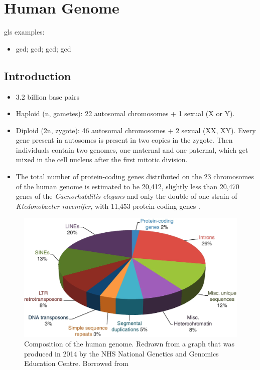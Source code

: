 \chapter{Human Genome}\label{chp:human_genome}

\minitoc

gls examples:
\begin{itemize}
	\item \Gls{gcd}; \acrlong{gcd}; \acrshort{gcd}; \acrfull{gcd}
\end{itemize}

\section{Introduction}
\begin{itemize}
    \item 3.2 billion base pairs 
    \item Haploid (n, gametes): 22 autosomal chromosomes + 1 sexual (X or Y).
    \item Diploid (2n, zygote): 46 autosomal chromosomes + 2 sexual (XX, XY). Every gene present in autosomes is present 
    in two copies in the zygote. Then individuals contain two genomes, one maternal and one paternal, which get mixed in 
    the cell nucleus after the first mitotic division.
    \item The total number of protein-coding genes distributed on the 23 chromosomes of the human genome is estimated to 
    be 20,412, slightly less than 20,470 genes of the \textit{Caenorhabditis elegans} \cite{Pena2021} and only the double of one strain of 
    \textit{Ktedonobacter racemifer}, with 11,453 protein-coding genes \cite{He2024}.
\end{itemize}
\begin{figure}[!ht]
    \centering
    \includegraphics[width=1\linewidth]{./figure/composition_human_genome.png}
    \caption{Composition of the human genome. Redrawn from a graph that was produced in 2014 by the NHS National Genetics 
    and Genomics Education Centre. Borrowed from  \cite{Pena2021}}
    \label{fig:composition_human_genome}
\end{figure}

